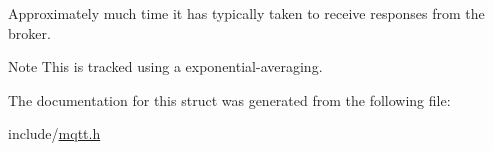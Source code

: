 Approximately much time it has typically taken to receive responses from the broker. 

\begin{DoxyNote}{Note}
This is tracked using a exponential-\/averaging. 
\end{DoxyNote}


The documentation for this struct was generated from the following file\+:\begin{DoxyCompactItemize}
\item 
include/\hyperlink{mqtt_8h}{mqtt.\+h}\end{DoxyCompactItemize}
